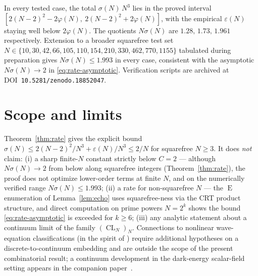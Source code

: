 \documentclass[11pt,reqno]{amsart}
\theoremstyle{plain}
\theoremstyle{definition}
\theoremstyle{remark}
\DeclareMathOperator{\CL}{CL}
\DeclareMathOperator{\ECHO}{E}
\begin{document}
In every tested case, the total $\sigma(N)\,N^{3}$ lies in the
proved interval $[2(N-2)^{2}-2\varphi(N),\ 2(N-2)^{2}+2\varphi(N)]$,
with the empirical $\varepsilon(N)$ staying well below
$2\varphi(N)$. The
quotients $N\sigma(N)$ are $1.28,\,1.73,\,1.961$ respectively.
Extension to a broader squarefree test set
$N\in\{10,30,42,66,105,110,154,210,330,462,770,1155\}$ tabulated
during preparation gives $N\sigma(N)\le 1.993$ in every case,
consistent with the asymptotic $N\sigma(N)\to 2$ in
\eqref{eq:rate-asymptotic}. Verification scripts are archived at
DOI~\texttt{10.5281/zenodo.18852047}.

\section{Scope and limits}\label{sec:scope}

Theorem~\ref{thm:rate} gives the explicit bound
$\sigma(N)\le 2(N-2)^{2}/N^{3}+\varepsilon(N)/N^{3}\le 2/N$ for
squarefree $N\ge 3$. It does \emph{not} claim:
(i) a sharp finite-$N$ constant strictly below $C=2$ --- although
$N\sigma(N)\to 2$ from below along squarefree integers
(Theorem~\ref{thm:rate}), the proof does not optimize lower-order
terms at finite $N$, and on the numerically verified range
$N\sigma(N)\le 1.993$;
(ii) a rate for non-squarefree $N$ --- the $\ECHO$ enumeration of
Lemma~\ref{lem:echo} uses squarefree-ness via the CRT product
structure, and direct computation on prime powers $N=2^{k}$ shows
the bound \eqref{eq:rate-asymptotic} is exceeded for $k\ge 6$;
(iii) any analytic statement about a continuum limit of the family
$(\CL_N)_{N}$. Connections to nonlinear wave-equation classifications
(in the spirit of \cite{BB1976}) require additional hypotheses on a
discrete-to-continuum embedding and are outside the scope of the
present combinatorial result; a continuum development in the
dark-energy scalar-field setting appears in the companion
paper~\cite{SandersGish2026JCAP}.
\end{document}
